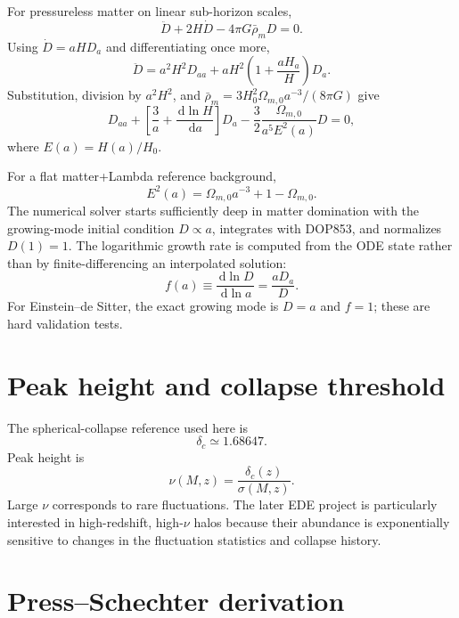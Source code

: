 \documentclass[11pt]{article}
\newcommand{\dd}{\,\mathrm d}
\begin{document}
For pressureless matter on linear sub-horizon scales,
\begin{equation}
\ddot D+2H\dot D-4\pi G\bar\rho_mD=0.
\end{equation}
Using $\dot D=aH D_a$ and differentiating once more,
\begin{equation}
\ddot D=a^2H^2D_{aa}+aH^2\left(1+\frac{aH_a}{H}\right)D_a.
\end{equation}
Substitution, division by $a^2H^2$, and $\bar\rho_m=3H_0^2\Omega_{m,0}a^{-3}/(8\pi G)$ give
\begin{equation}
\boxed{
D_{aa}+\left[\frac{3}{a}+\frac{\dd\ln H}{\dd a}\right]D_a
-\frac{3}{2}\frac{\Omega_{m,0}}{a^5E^2(a)}D=0,
}
\end{equation}
where $E(a)=H(a)/H_0$.

For a flat matter+Lambda reference background,
\begin{equation}
E^2(a)=\Omega_{m,0}a^{-3}+1-\Omega_{m,0}.
\end{equation}
The numerical solver starts sufficiently deep in matter domination with the growing-mode initial condition $D\propto a$, integrates with DOP853, and normalizes $D(1)=1$. The logarithmic growth rate is computed from the ODE state rather than by finite-differencing an interpolated solution:
\begin{equation}
\boxed{f(a)\equiv \frac{\dd\ln D}{\dd\ln a}=\frac{aD_a}{D}}.
\end{equation}
For Einstein--de Sitter, the exact growing mode is $D=a$ and $f=1$; these are hard validation tests.

\section{Peak height and collapse threshold}

The spherical-collapse reference used here is
\begin{equation}
\delta_c\simeq1.68647.
\end{equation}
Peak height is
\begin{equation}
\boxed{\nu(M,z)=\frac{\delta_c(z)}{\sigma(M,z)}}.
\end{equation}
Large $\nu$ corresponds to rare fluctuations. The later EDE project is particularly interested in high-redshift, high-$\nu$ halos because their abundance is exponentially sensitive to changes in the fluctuation statistics and collapse history.

\section{Press--Schechter derivation}
\end{document}
